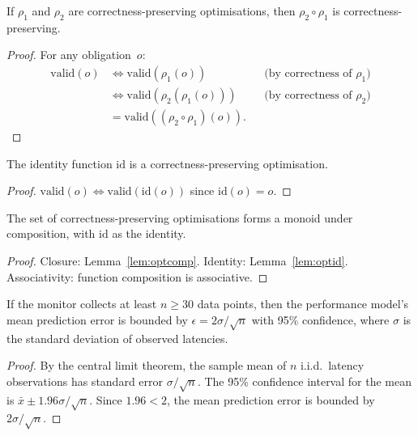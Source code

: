 \documentclass[11pt]{article}
\begin{document}
\begin{lemma}%
\label{lem:optcomp}
If $\rho_1$ and $\rho_2$ are correctness-preserving
optimisations, then $\rho_2 \circ \rho_1$ is
correctness-preserving.
\end{lemma}
\begin{proof}
For any obligation~$o$:
\begin{align*}
  \mathrm{valid}(o)
  &\iff \mathrm{valid}(\rho_1(o))
    && \text{(by correctness of $\rho_1$)} \\
  &\iff \mathrm{valid}(\rho_2(\rho_1(o)))
    && \text{(by correctness of $\rho_2$)} \\
  &= \mathrm{valid}((\rho_2 \circ \rho_1)(o)).
\end{align*}
\end{proof}

\begin{lemma}%
\label{lem:optid}
The identity function $\mathrm{id}$ is a
correctness-preserving optimisation.
\end{lemma}
\begin{proof}
$\mathrm{valid}(o) \iff \mathrm{valid}(\mathrm{id}(o))$
since $\mathrm{id}(o) = o$.
\end{proof}

\begin{corollary}%
\label{cor:optmonoid}
The set of correctness-preserving optimisations forms a
monoid under composition, with $\mathrm{id}$ as the identity.
\end{corollary}
\begin{proof}
Closure: Lemma~\ref{lem:optcomp}.
Identity: Lemma~\ref{lem:optid}.
Associativity: function composition is associative.
\end{proof}

\begin{lemma}%
\label{lem:perfcalib}
If the monitor collects at least $n \geq 30$ data points,
then the performance model's mean prediction error is
bounded by $\epsilon = 2 \sigma / \sqrt{n}$ with 95\%
confidence, where $\sigma$ is the standard deviation
of observed latencies.
\end{lemma}
\begin{proof}
By the central limit theorem, the sample mean of $n$
i.i.d.\ latency observations has standard error
$\sigma / \sqrt{n}$.  The 95\% confidence interval
for the mean is $\bar{x} \pm 1.96 \sigma / \sqrt{n}$.
Since $1.96 < 2$, the mean prediction error is bounded
by $2 \sigma / \sqrt{n}$.
\end{proof}
\end{document}
